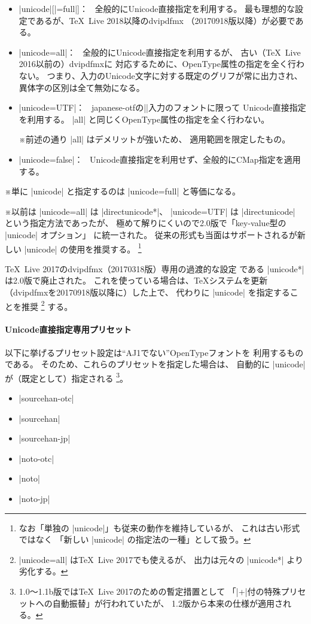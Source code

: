 \documentclass[uplatex,dvipdfmx,a4paper]{jsarticle}
\newcommand{\Pkg}[1]{\textsf{#1}}
\newcommand{\Note}{\par\noindent ※}
\newcommand{\Means}{：\ }
\providecommand{\Strong}[1]{\textsf{#1}}
\begin{document}
\begin{itemize}
\item |unicode|[|=full|]\Means
  全般的にUnicode直接指定を利用する。
  最も理想的な設定であるが、\Strong{{\TeX}~Live 2018以降のdvipdfmx}%
  （20170918版以降）が必要である。
\item |unicode=all|\Means
  全般的にUnicode直接指定を利用するが、
  古い（{\TeX}~Live 2016以前の）dvipdfmxに
  対応するために、OpenType属性の指定を全く行わない。
  つまり、入力のUnicode文字に対する既定のグリフが常に出力され、
  異体字の区別は全て無効になる。
\item |unicode=UTF|\Means
  \Pkg{japanese-otf}の|\UTF|入力のフォントに限って
  Unicode直接指定を利用する。
  |all| と同じくOpenType属性の指定を全く行わない。
  \Note 前述の通り |all| はデメリットが強いため、
  適用範囲を限定したもの。
\item |unicode=false|\Means
  Unicode直接指定を利用せず、全般的にCMap指定を適用する。
\end{itemize}

\Note 単に |unicode| と指定するのは |unicode=full| と等価になる。
\Note 以前は |unicode=all| は |directunicode*|、
|unicode=UTF| は |directunicode| という指定方法であったが、
極めて解りにくいので2.0版で「key-value型の |unicode| オプション」
に統一された。
従来の形式も当面はサポートされるが新しい |unicode| の使用を推奨する。%
\footnote{なお「単独の |unicode|」も従来の動作を維持しているが、
  これは古い形式ではなく
  「新しい |unicode| の指定法の一種」として扱う。}

{\TeX}~Live 2017のdvipdfmx（20170318版）専用の\Strong{過渡的}な設定
である |unicode*| は2.0版で\Strong{廃止}された。
これを使っている場合は、\Strong{{\TeX}システムを更新}%
（dvipdfmxを20170918版以降に）した上で、
代わりに |unicode| を指定することを推奨
\footnote{|unicode=all| は{\TeX}~Live 2017でも使えるが、
  出力は元々の |unicode*| より劣化する。}%
する。

\paragraph{Unicode直接指定専用プリセット}

以下に挙げるプリセット設定は“AJ1でない”OpenTypeフォントを
利用するものである。
そのため、これらのプリセットを指定した場合は、
自動的に |unicode| が（既定として）指定される%
\footnote{1.0～1.1b版では{\TeX}~Live 2017のための暫定措置として
「|+|付の特殊プリセットへの自動振替」が行われていたが、
1.2版から本来の仕様が適用される。}。

\begin{itemize}
\item |sourcehan-otc|
\item |sourcehan|
\item |sourcehan-jp|
\item |noto-otc|
\item |noto|
\item |noto-jp|
\end{itemize}
\end{document}
